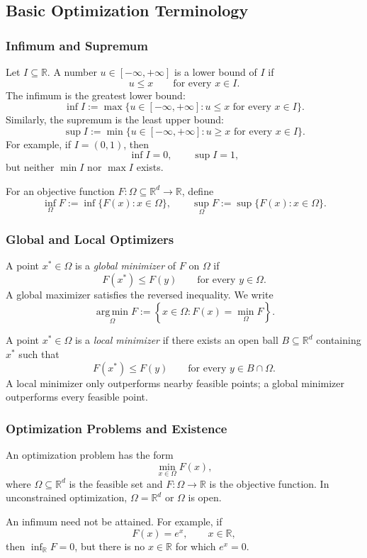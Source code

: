 \documentclass[12pt,oneside]{book}
\numberwithin{equation}{section}
\theoremstyle{definition}
\theoremstyle{plain}
\theoremstyle{remark}
\newcommand{\R}{\mathbb{R}}
\newcommand{\argmin}{\operatorname*{arg\,min}}
\begin{document}
\subsection{Basic Optimization Terminology}
\subsubsection{Infimum and Supremum}
Let $I\subseteq\R$. A number $u\in[-\infty,+\infty]$ is a lower bound of $I$ if
\[
u\leq x\qquad\text{for every }x\in I.
\]
The infimum is the greatest lower bound:
\[
\inf I
:=\max\{u\in[-\infty,+\infty]:u\leq x
\text{ for every }x\in I\}.
\]
Similarly, the supremum is the least upper bound:
\[
\sup I
:=\min\{u\in[-\infty,+\infty]:u\geq x
\text{ for every }x\in I\}.
\]
For example, if $I=(0,1)$, then
\[
\inf I=0,
\qquad
\sup I=1,
\]
but neither $\min I$ nor $\max I$ exists.

For an objective function $F\colon\Omega\subseteq\R^d\to\R$, define
\[
\inf_{\Omega}F:=\inf\{F(x):x\in\Omega\},
\qquad
\sup_{\Omega}F:=\sup\{F(x):x\in\Omega\}.
\]

\subsubsection{Global and Local Optimizers}
A point $x^*\in\Omega$ is a \emph{global minimizer} of $F$ on $\Omega$ if
\[
F(x^*)\leq F(y)
\qquad\text{for every }y\in\Omega.
\]
A global maximizer satisfies the reversed inequality. We write
\[
\argmin_{\Omega}F
:=\left\{x\in\Omega:F(x)=\min_{\Omega}F\right\}.
\]

A point $x^*\in\Omega$ is a \emph{local minimizer} if there exists an open ball $B\subseteq\R^d$ containing $x^*$ such that
\[
F(x^*)\leq F(y)
\qquad\text{for every }y\in B\cap\Omega.
\]
A local minimizer only outperforms nearby feasible points; a global minimizer outperforms every feasible point.

\subsubsection{Optimization Problems and Existence}
An optimization problem has the form
\[
\min_{x\in\Omega}F(x),
\]
where $\Omega\subseteq\R^d$ is the feasible set and $F\colon\Omega\to\R$ is the objective function. In unconstrained optimization, $\Omega=\R^d$ or $\Omega$ is open.

An infimum need not be attained. For example, if
\[
F(x)=e^x,
\qquad x\in\R,
\]
then $\inf_{\R}F=0$, but there is no $x\in\R$ for which $e^x=0$.
\end{document}
